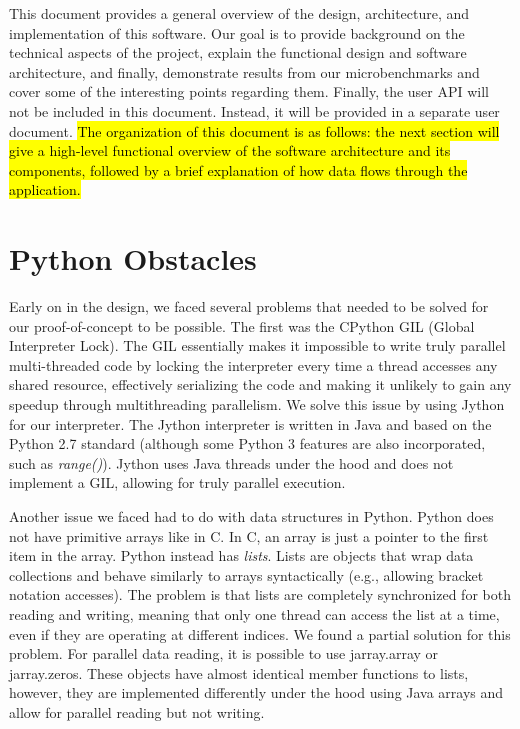 \documentclass[letterpaper,12pt]{article} %
\begin{document}
This document provides a general overview of the design, architecture, and implementation of this software. Our goal is to provide background on the technical aspects of the project, explain the functional design and software architecture, and finally, demonstrate results from our microbenchmarks and cover some of the interesting points regarding them. \iffalse It is our intention to give the most comprehensive technical understanding of our software possible without being overly verbose.\fi Finally, the user API will not be included in this document. Instead, it will be provided in a separate user document.  \hl{The organization of this document is as follows: the next section will give a high-level functional overview of the software architecture and its components, followed by a brief explanation of how data flows through the application. }


\section{Python Obstacles}
Early on in the design, we faced several problems that needed to be solved for our proof-of-concept to be possible. The first was the CPython GIL (Global Interpreter Lock). The GIL essentially makes it impossible to write truly parallel multi-threaded code by locking the interpreter every time a thread accesses any shared resource, effectively serializing the code and making it unlikely to gain any speedup through multithreading parallelism. We solve this issue by using Jython for our interpreter. The Jython interpreter is written in Java and based on the Python 2.7 standard (although some Python 3 features are also incorporated, such as \textit{range()}). Jython uses Java threads under the hood and does not implement a GIL, allowing for truly parallel execution. 

Another issue we faced had to do with data structures in Python. Python does not have primitive arrays like in C. In C, an array is just a pointer to the first item in the array. Python instead has \textit{lists}. Lists are objects that wrap data collections and behave similarly to arrays syntactically (e.g., allowing bracket notation accesses). The problem is that lists are completely synchronized for both reading and writing, meaning that only one thread can access the list at a time, even if they are operating at different indices. We found a partial solution for this problem. For parallel data reading, it is possible to use jarray.array or jarray.zeros. These objects have almost identical member functions to lists, however, they are implemented differently under the hood using Java arrays and allow for parallel reading but not writing. 
\end{document}

